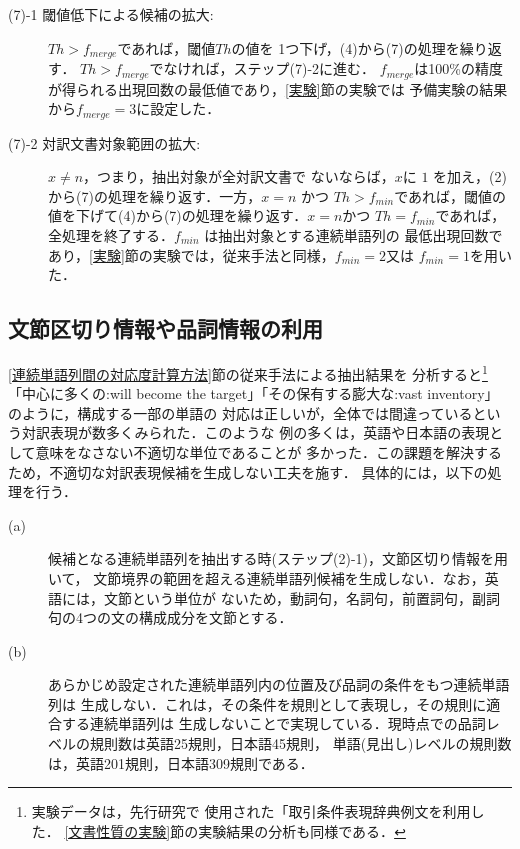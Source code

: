 \begin{description}
\item[(7)-1 閾値低下による候補の拡大:] $Th > f_{merge} $であれば，閾値$Th$の値を
1つ下げ，(4)から(7)の処理を繰り返す．
$Th > f_{merge} $でなければ，ステップ(7)-2に進む．
$f_{merge}$は100\%の精度が得られる出現回数の最低値であり，\ref{実験}節の実験では
予備実験の結果から$ f_{merge}=3 $に設定した．

\item[(7)-2 対訳文書対象範囲の拡大:] $ x \neq n $，つまり，抽出対象が全対訳文書で
ないならば，$x$に $1$ を加え，(2)から(7)の処理を繰り返す．一方，$x=n$ かつ 
$Th > f_{min}$であれば，閾値の値を下げて(4)から(7)の処理を繰り返す．$x=n$かつ
$Th=f_{min}$であれば，全処理を終了する．$f_{min}$ は抽出対象とする連続単語列の
最低出現回数であり，\ref{実験}節の実験では，従来手法と同様，$f_{min}=2$又は
$f_{min}=1$を用いた．

\end{description}

\subsection{文節区切り情報や品詞情報の利用}
\label{文節情報利用}

\ref{連続単語列間の対応度計算方法}節の従来手法による抽出結果を
分析すると\footnote{実験データは，先行研究\cite{北村97}で
使用された「取引条件表現辞典例文\cite{石上:1992}を利用した．
\ref{文書性質の実験}節の実験結果の分析も同様である．}「中心に多くの:will become 
the target」「その保有する膨大な:vast inventory」のように，構成する一部の単語の
対応は正しいが，全体では間違っているという対訳表現が数多くみられた．このような
例の多くは，英語や日本語の表現として意味をなさない不適切な単位であることが
多かった．この課題を解決するため，不適切な対訳表現候補を生成しない工夫を施す．
具体的には，以下の処理を行う．

\begin{description}

\item[(a)] 候補となる連続単語列を抽出する時(ステップ(2)-1)，文節区切り情報を用いて，
文節境界の範囲を超える連続単語列候補を生成しない．なお，英語には，文節という単位が
ないため，動詞句，名詞句，前置詞句，副詞句の4つの文の構成成分を文節とする．

\item[(b)] あらかじめ設定された連続単語列内の位置及び品詞の条件をもつ連続単語列は
生成しない．これは，その条件を規則として表現し，その規則に適合する連続単語列は
生成しないことで実現している．現時点での品詞レベルの規則数は英語25規則，日本語45規則，
単語(見出し)レベルの規則数は，英語201規則，日本語309規則である．
\end{description}


